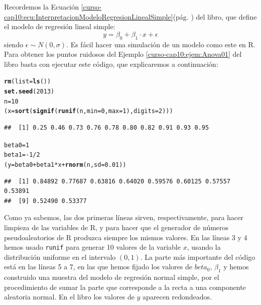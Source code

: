 \documentclass[10pt,a4paper]{article}\usepackage[]{graphicx}\usepackage[]{color}
\makeatletter
\newcommand{\hlnum}[1]{\textcolor[rgb]{0.686,0.059,0.569}{#1}}%
\newcommand{\hlopt}[1]{\textcolor[rgb]{0,0,0}{#1}}%
\newcommand{\hlstd}[1]{\textcolor[rgb]{0.345,0.345,0.345}{#1}}%
\newcommand{\hlkwb}[1]{\textcolor[rgb]{0.69,0.353,0.396}{#1}}%
\newcommand{\hlkwc}[1]{\textcolor[rgb]{0.333,0.667,0.333}{#1}}%
\newcommand{\hlkwd}[1]{\textcolor[rgb]{0.737,0.353,0.396}{\textbf{#1}}}%
\newenvironment{kframe}{%
 \def\at@end@of@kframe{}%
 \ifinner\ifhmode%
  \def\at@end@of@kframe{\end{minipage}}%
  \begin{minipage}{\columnwidth}%
 \fi\fi%
 \def\FrameCommand##1{\hskip\@totalleftmargin \hskip-\fboxsep
 \colorbox{shadecolor}{##1}\hskip-\fboxsep
     \hskip-\linewidth \hskip-\@totalleftmargin \hskip\columnwidth}%
 \MakeFramed {\advance\hsize-\width
   \@totalleftmargin\z@ \linewidth\hsize
   \@setminipage}}%
 {\par\unskip\endMakeFramed%
 \at@end@of@kframe}
\newenvironment{knitrout}{}{} %
\newcounter {cont01}
\makeatother
\begin{document}
Recordemos la Ecuación \ref{curso-cap10:ecu:InterpretacionModeloRegresionLinealSimple}(pág. \pageref{curso-cap10:ecu:InterpretacionModeloRegresionLinealSimple}) del libro, que define el modelo de regresión lineal simple:
\[y=\beta_0 + \beta_1\cdot x + \epsilon\]
siendo $\epsilon\sim N(0,\sigma)$. Es fácil hacer una simulación de un modelo como este en R. Para obtener los puntos ruidosos del  Ejemplo \ref{curso-cap10:ejem:Anova01} del libro basta con ejecutar este código, que explicaremos a continuación:
\begin{knitrout}
\color{fgcolor}\begin{kframe}
\begin{alltt}
\hlkwd{rm}\hlstd{(}\hlkwc{list}\hlstd{=}\hlkwd{ls}\hlstd{())}
\hlkwd{set.seed}\hlstd{(}\hlnum{2013}\hlstd{)}
\hlstd{n} \hlkwb{=} \hlnum{10}
\hlstd{(x} \hlkwb{=} \hlkwd{sort}\hlstd{(}\hlkwd{signif}\hlstd{(}\hlkwd{runif}\hlstd{(n,} \hlkwc{min}\hlstd{=}\hlnum{0}\hlstd{,} \hlkwc{max}\hlstd{=}\hlnum{1} \hlstd{),} \hlkwc{digits}\hlstd{=}\hlnum{2}\hlstd{) )  )}
\end{alltt}
\begin{verbatim}
##  [1] 0.25 0.46 0.73 0.76 0.78 0.80 0.82 0.91 0.93 0.95
\end{verbatim}
\begin{alltt}
\hlstd{beta0} \hlkwb{=} \hlnum{1}
\hlstd{beta1} \hlkwb{=} \hlopt{-}\hlnum{1}\hlopt{/}\hlnum{2}
\hlstd{(y} \hlkwb{=} \hlstd{beta0} \hlopt{+} \hlstd{beta1} \hlopt{*} \hlstd{x} \hlopt{+} \hlkwd{rnorm}\hlstd{(n,}\hlkwc{sd}\hlstd{=}\hlnum{0.01}\hlstd{))}
\end{alltt}
\begin{verbatim}
##  [1] 0.84892 0.77687 0.63816 0.64020 0.59576 0.60125 0.57557 0.53891
##  [9] 0.52490 0.53377
\end{verbatim}
\end{kframe}
\end{knitrout}
Como ya sabemos, las dos primeras líneas sirven, respectivamente, para hacer limpieza de las variables de R, y para hacer que el generador de números pseudoaleatorios de R produzca siempre los mismos valores.
En las líneas 3 y 4 hemos usado {\tt runif} para generar 10 valores de la variable $x$, usando la distribución uniforme en el intervalo $(0,1)$. La parte más importante del código está en las líneas 5 a 7, en las que hemos fijado los valores de $beta_0$, $\beta_1$ y hemos construido una muestra del modelo de regresión normal simple, por el procedimiento de sumar la parte que corresponde a la recta a una componente aleatoria normal. En el libro los valores  de $y$ aparecen redondeados.
\end{document}

